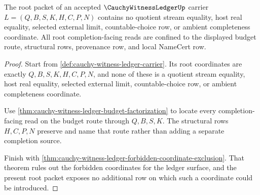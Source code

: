\begin{theorem}
\label{thm:cauchy-witness-ledger-root-forbidden-coordinate-exclusion-packet}
The root packet of an accepted $\CauchyWitnessLedgerUp$ carrier $L=(Q,B,S,K,H,C,P,N)$ contains no quotient stream equality, host real equality, selected external limit, countable-choice row, or ambient completeness coordinate. All root completion-facing reads are confined to the displayed budget route, structural rows, provenance row, and local NameCert row.
\end{theorem}
\begin{proof}
Start from \autoref{def:cauchy-witness-ledger-carrier}. Its root coordinates are exactly $Q,B,S,K,H,C,P,N$, and none of these is a quotient stream equality, host real equality, selected external limit, countable-choice row, or ambient completeness coordinate.

Use \autoref{thm:cauchy-witness-ledger-budget-factorization} to locate every completion-facing read on the budget route through $Q,B,S,K$. The structural rows $H,C,P,N$ preserve and name that route rather than adding a separate completion source.

Finish with \autoref{thm:cauchy-witness-ledger-forbidden-coordinate-exclusion}. That theorem rules out the forbidden coordinates for the ledger surface, and the present root packet exposes no additional row on which such a coordinate could be introduced.
\end{proof}

